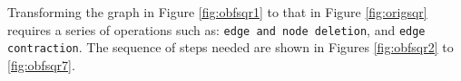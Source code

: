 \documentclass[conference]{IEEEtran}
\begin{document}
Transforming the graph in Figure \ref{fig:obfsqr1} to that in Figure \ref{fig:origsqr} requires a series of operations such as: {\tt edge and node deletion}, and {\tt edge contraction}. 
The sequence of steps needed are shown in Figures \ref{fig:obfsqr2} to \ref{fig:obfsqr7}.
\begin{figure}[ht!]
 \centering
\end{figure}
\end{document}
